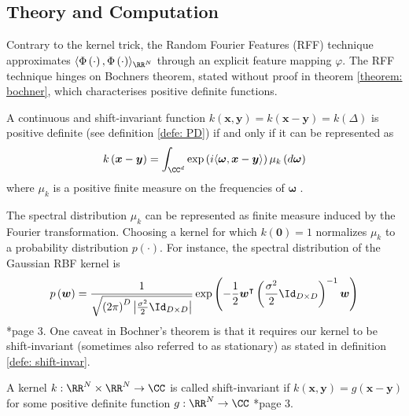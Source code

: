 \subsection{Theory and Computation}\label{Section3.1}
Contrary to the kernel trick, the Random Fourier Features (RFF) technique approximates $\langle \Phi \left( \cdot \right) , \Phi \left( \cdot \right) \rangle_{\RR^N}$ through an explicit feature mapping $\varphi$. The RFF technique hinges on Bochners theorem, stated without proof in theorem \ref{theorem: bochner}, which characterises positive definite functions.

\begin{thm}[Bochner's] \label{theorem: bochner}
    A continuous and shift-invariant function $k \left( \bm{x} , \bm{y} \right) = k \left( \bm{x} - \bm{y} \right) = k \left( \Delta \right)$ is positive definite (see definition \ref{defe: PD}) if and only if it can be represented as
    \[
        k \left( \bm{x} - \bm{y} \right) = \int_{\CC^d} \exp \left( i \langle \bm{\omega} , \bm{x} - \bm{y} \rangle \right) \mu_k \left( d \bm{\omega} \right)
    \]
    where $\mu_k$ is a positive finite measure on the frequencies of $\bm{\omega}$ \cite{HahnHans1933SBVü,LiuFanghui2021RFfK}.
\end{thm}

The spectral distribution $\mu_k$ can be represented as finite measure induced by the Fourier transformation. Choosing a kernel for which $k (\bm{0}) = 1$ normalizes $\mu_k$ to a probability distribution $p (\cdot)$. For instance, the spectral distribution of the Gaussian RBF kernel is
\begin{equation} \label{eq: rbf-spec-pdf}
    p \left( \bm{w}\right) = \frac{1}{\sqrt{\left( 2 \pi\right)^{D} \left| \frac{\sigma^2}{2} \Id_{D \times D} \right|}} \exp \left( -\frac{1}{2} \bm{w}^\intercal \left( \frac{\sigma^2}{2} \Id_{D \times D} \right)^{-1} \bm{w} \right)
\end{equation}
\cite{NIPS2007_013a006f}*{page 3}. One caveat in Bochner's theorem is that it requires our kernel to be shift-invariant (sometimes also referred to as stationary) as stated in definition \ref{defe: shift-invar}.

\begin{defe} \label{defe: shift-invar}
    A kernel $k : \RR^N \times \RR^N \to \CC$ is called shift-invariant if $k \left( \bm{x}, \bm{y} \right) = g \left( \bm{x} - \bm{y} \right)$ for some positive definite function $g : \RR^N \to \CC$ \cite{JMLR:v17:14-538}*{page 3}.
\end{defe}

